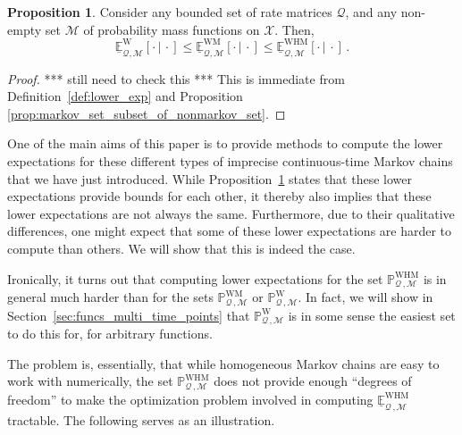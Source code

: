 \documentclass[10pt,a4paper]{paper}
\theoremstyle{definition}
\newtheorem{proposition}[theorem]{Proposition}
\newcommand{\states}{\mathcal{X}}
\newcommand{\processes}{\mathbb{P}}
\newcommand{\wprocesses}{\processes^{\mathrm{W}}}
\newcommand{\wmprocesses}{\processes^{\mathrm{WM}}}
\newcommand{\whmprocesses}{\processes^{\mathrm{WHM}}}
\newcommand{\rateset}{\mathcal{Q}}
\begin{document}




\begin{proposition}\label{prop:lower_exp_markov_bounded_by_nonmarkov}
Consider any bounded set of rate matrices $\rateset$, and any non-empty set $\mathcal{M}$ of probability mass functions on $\states$. Then,
\begin{equation*}
\underline{\mathbb{E}}_{\rateset,\mathcal{M}}^\mathrm{W}[\cdot\,\vert\,\cdot] \leq
\underline{\mathbb{E}}_{\rateset,\mathcal{M}}^\mathrm{WM}[\cdot\,\vert\,\cdot] \leq
\underline{\mathbb{E}}_{\rateset,\mathcal{M}}^\mathrm{WHM}[\cdot\,\vert\,\cdot]\,.
\end{equation*}
\end{proposition}
\begin{proof}
*** still need to check this *** This is immediate from Definition~\ref{def:lower_exp} and Proposition \ref{prop:markov_set_subset_of_nonmarkov_set}.
\end{proof}

One of the main aims of this paper is to provide methods to compute the lower expectations for these different types of imprecise continuous-time Markov chains that we have just introduced. While Proposition~\ref{prop:lower_exp_markov_bounded_by_nonmarkov} states that these lower expectations provide bounds for each other, it thereby also implies that these lower expectations are not always the same. Furthermore, due to their qualitative differences, one might expect that some of these lower expectations are harder to compute than others. We will show that this is indeed the case.

Ironically, it turns out that computing lower expectations for the set $\whmprocesses_{\rateset\,,\mathcal{M}}$ is in general much harder than for the sets $\wmprocesses_{\rateset\,,\mathcal{M}}$ or $\wprocesses_{\rateset\,,\mathcal{M}}$. In fact, we will show in Section~\ref{sec:funcs_multi_time_points} that $\wprocesses_{\rateset\,,\mathcal{M}}$ is in some sense the easiest set to do this for, for arbitrary functions. 

The problem is, essentially, that while homogeneous Markov chains are easy to work with numerically, the set $\whmprocesses_{\rateset\,,\mathcal{M}}$ does not provide enough ``degrees of freedom'' to make the optimization problem involved in computing $\underline{\mathbb{E}}^\mathrm{WHM}_{\rateset\,,\mathcal{M}}$ tractable. The following serves as an illustration. 
\end{document}
